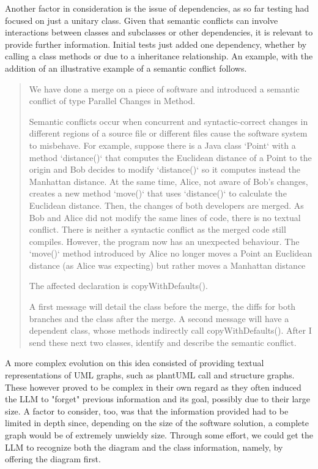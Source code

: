 Another factor in consideration is the issue of dependencies, as so far testing had focused on just a unitary class. Given that semantic conflicts can involve interactions between classes and subclasses or other dependencies, it is relevant to provide further information. Initial tests just added one dependency, whether by calling a class methods or due to a inheritance relationship. An example, with the addition of an illustrative example of a semantic conflict follows.

\begin{quote}
We have done a merge on a piece of software and introduced a semantic conflict of type Parallel Changes in Method.

Semantic conflicts occur when concurrent and syntactic-correct changes in different regions of a source file or different files cause the software system to misbehave. For example, suppose there is a Java class `Point` with a method `distance()` that computes the Euclidean distance of a Point to the origin and Bob decides to modify `distance()` so it computes instead the Manhattan distance. At the same time, Alice, not aware of Bob's changes, creates a new method `move()` that uses `distance()` to calculate the Euclidean distance. Then, the changes of both developers are merged. As Bob and Alice did not modify the same lines of code, there is no textual conflict. There is neither a syntactic conflict as the merged code still compiles. However, the program now has an unexpected behaviour. The `move()` method introduced by Alice no longer moves a Point an Euclidean distance (as Alice was expecting) but rather moves a Manhattan distance

The affected declaration is copyWithDefaults().

A first message will detail the class before the merge, the diffs for both branches and the class after the merge. A second message will have a dependent class, whose methods indirectly call copyWithDefaults(). After I send these next two classes, identify and describe the semantic conflict.    
\end{quote}

A more complex evolution on this idea consisted of providing textual representations of UML graphs, such as plantUML call and structure graphs. These however proved to be complex in their own regard as they often induced the LLM to "forget" previous information and its goal, possibly due to their large size. A factor to consider, too, was that the information provided had to be limited in depth since, depending on the size of the software solution, a complete graph would be of extremely unwieldy size. Through some effort, we could get the LLM to recognize both the diagram and the class information, namely, by offering the diagram first.

